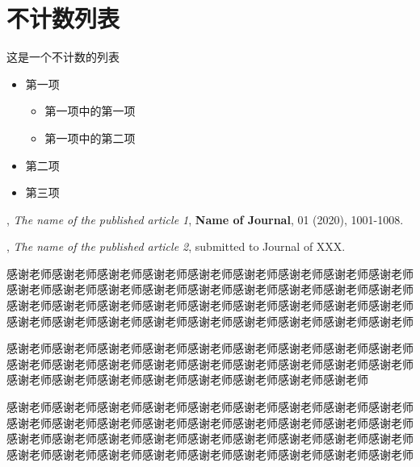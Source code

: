 \documentclass{shnuthesis}
\begin{document}
\section{不计数列表}

这是一个不计数的列表
\begin{itemize}
	\item 第一项
	\begin{itemize}
		\item 第一项中的第一项
		\item 第一项中的第二项
	\end{itemize}
	\item 第二项
	\item 第三项
\end{itemize}



\nocite{*}  %





\begin{researchpage}

,  {\em The name of the published article 1}, {\bf Name of Journal}, 01 (2020), 1001-1008.


,  {\em The name of the published article 2}, submitted to
Journal of XXX.


\end{researchpage}




\begin{thankpage}
\setlength{\baselineskip}{24pt}

感谢老师感谢老师感谢老师感谢老师感谢老师感谢老师感谢老师感谢老师感谢老师感谢老师感谢老师感谢老师感谢老师感谢老师感谢老师感谢老师感谢老师感谢老师感谢老师感谢老师感谢老师感谢老师感谢老师感谢老师感谢老师感谢老师感谢老师感谢老师感谢老师感谢老师感谢老师感谢老师感谢老师感谢老师感谢老师感谢老师
		
感谢老师感谢老师感谢老师感谢老师感谢老师感谢老师感谢老师感谢老师感谢老师感谢老师感谢老师感谢老师感谢老师感谢老师感谢老师感谢老师感谢老师感谢老师感谢老师感谢老师感谢老师感谢老师感谢老师感谢老师感谢老师感谢老师

感谢老师感谢老师感谢老师感谢老师感谢老师感谢老师感谢老师感谢老师感谢老师感谢老师感谢老师感谢老师感谢老师感谢老师感谢老师感谢老师感谢老师感谢老师感谢老师感谢老师感谢老师感谢老师感谢老师感谢老师感谢老师感谢老师感谢老师感谢老师感谢老师感谢老师感谢老师感谢老师感谢老师感谢老师感谢老师感谢老师

\end{thankpage}
\end{document}
